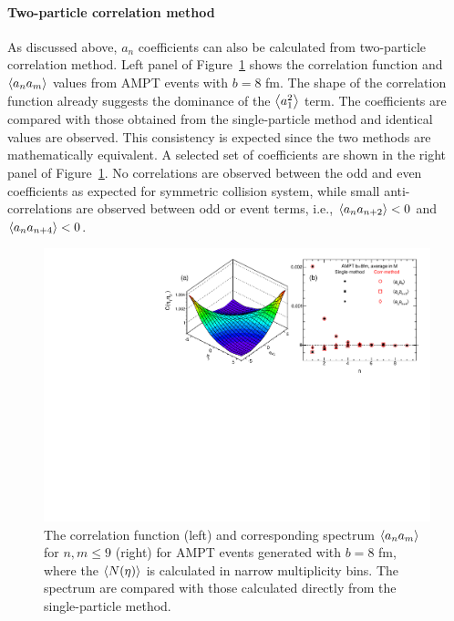\paragraph{Two-particle correlation method}

As discussed above, $a_n$ coefficients can also be calculated from two-particle correlation method. Left panel of Figure~\ref{fig:fbcorr_Model_1pc_2pc_comp} shows the correlation function and $\left\langle a_n a_m\right\rangle$ values from AMPT events with $b=8$ fm. The shape of the correlation function already suggests the dominance of the $\left\langle a_1^2\right\rangle$ term. The coefficients are compared with those obtained from the single-particle method and identical values are observed. This consistency is expected since the two methods are mathematically equivalent. A selected set of coefficients are shown in the right panel of Figure~\ref{fig:fbcorr_Model_1pc_2pc_comp}. No correlations are observed between the odd and even coefficients as expected for symmetric collision system, while small anti-correlations are observed between odd or event terms, i.e., $\left\langle a_n a_{n+2}\right\rangle<0$ and $\left\langle a_n a_{n+4}\right\rangle<0$.

\begin{figure}[H]
\centering
\includegraphics[width=.95\linewidth]{figs/chapter_fbcorr/Model_1pc_2pc_comp.pdf}
\caption{The correlation function (left) and corresponding spectrum $\left\langle a_n a_m\right\rangle$ for $n,m \le 9$ (right) for AMPT events generated with $b=8$ fm, where the $\left\langle N(\eta)\right\rangle$ is calculated in narrow multiplicity bins. The spectrum are compared with those calculated directly from the single-particle method.}
\label{fig:fbcorr_Model_1pc_2pc_comp}
\end{figure}

